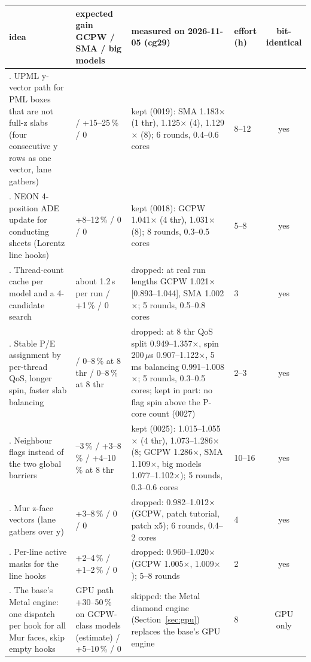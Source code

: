 \begin{table}[htbp]\centering\small
\setlength{\tabcolsep}{4pt}
\begin{tabular}{@{}>{\raggedright\arraybackslash}p{}>{\raggedright\arraybackslash}p{}>{\raggedright\arraybackslash}p{}lc@{}}
\toprule
idea & expected gain GCPW / SMA / big models & measured on 2026-11-05 (cg29) & effort (h) & bit-identical \\
\midrule
1. UPML y-vector path for PML boxes that are not full-z slabs (four consecutive y rows as one vector, lane gathers) & 0 / +15--25\,\% / 0 & kept (0019): SMA 1.183$\times$ (1 thr), 1.125$\times$ (4), 1.129$\times$ (8); 6 rounds, 0.4--0.6 cores & 8--12 & yes \\
2. NEON 4-position ADE update for conducting sheets (Lorentz line hooks) & +8--12\,\% / 0 / 0 & kept (0018): GCPW 1.041$\times$ (4 thr), 1.031$\times$ (8); 8 rounds, 0.3--0.5 cores & 5--8 & yes \\
3. Thread-count cache per model and a 4-candidate search & about 1.2\,s per run / +1\,\% / 0 & dropped: at real run lengths GCPW 1.021$\times$ [0.893--1.044], SMA 1.002$\times$; 5 rounds, 0.5--0.8 cores & 3 & yes \\
4. Stable P/E assignment by per-thread QoS, longer spin, faster slab balancing & 0 / 0--8\,\% at 8 thr / 0--8\,\% at 8 thr & dropped: at 8 thr QoS split 0.949--1.357$\times$, spin 200\,$\mu$s 0.907--1.122$\times$, 5\,ms balancing 0.991--1.008$\times$; 5 rounds, 0.3--0.5 cores; kept in part: no flag spin above the P-core count (0027) & 2--3 & yes \\
5. Neighbour flags instead of the two global barriers & 0--3\,\% / +3--8\,\% / +4--10\,\% at 8 thr & kept (0025): 1.015--1.055$\times$ (4 thr), 1.073--1.286$\times$ (8; GCPW 1.286$\times$, SMA 1.109$\times$, big models 1.077--1.102$\times$); 5 rounds, 0.3--0.6 cores & 10--16 & yes \\
6. Mur z-face vectors (lane gathers over y) & +3--8\,\% / 0 / 0 & dropped: 0.982--1.012$\times$ (GCPW, patch tutorial, patch x5); 6 rounds, 0.4--2 cores & 4 & yes \\
7. Per-line active masks for the line hooks & +2--4\,\% / +1--2\,\% / 0 & dropped: 0.960--1.020$\times$ (GCPW 1.005$\times$, 1.009$\times$); 5--8 rounds & 2 & yes \\
8. The base's Metal engine: one dispatch per hook for all Mur faces, skip empty hooks & GPU path +30--50\,\% on GCPW-class models (estimate) / +5--10\,\% / 0 & skipped: the Metal diamond engine (Section~\ref{sec:gpu}) replaces the base's GPU engine & 8 & GPU only \\

\end{tabular}
\end{table}
